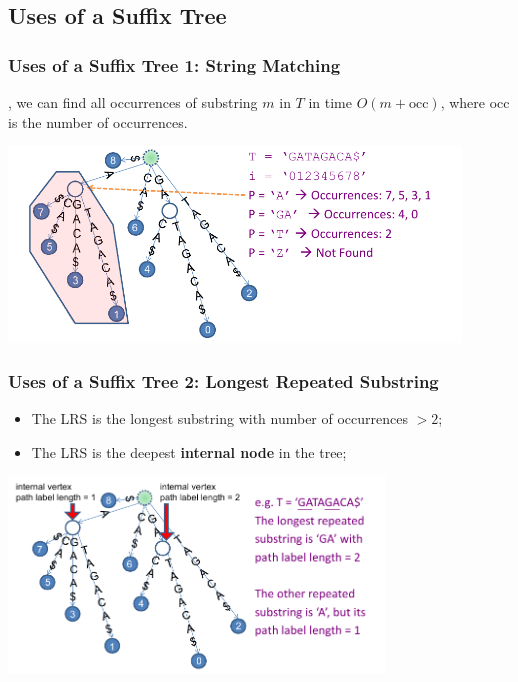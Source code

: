 \subsection{Uses of a Suffix Tree}
\begin{frame}
  \frametitle{Uses of a Suffix Tree 1: String Matching} {\smaller

    ,
    we can find all occurrences of substring $m$ in $T$ in time
    $O(m+\text{occ})$, where occ is the number of occurrences.

  \begin{center}
    \includegraphics[width=0.9\textwidth]{../img/stringmatching_halim}
  \end{center}
  }
\end{frame}

\begin{frame}
  \frametitle{Uses of a Suffix Tree 2: Longest Repeated Substring}
  \begin{itemize}
  \item The LRS is the longest substring with number of occurrences $> 2$;
  \item The LRS is the deepest {\bf internal node} in the tree;
  \end{itemize}

  \begin{center}
    \includegraphics[width=0.75\textwidth]{../img/longestrepeatingsubstring_halim}
  \end{center}
\end{frame}


